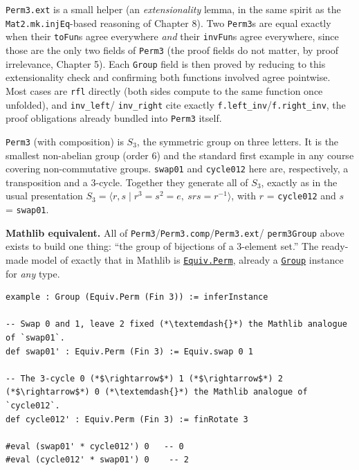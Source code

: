 \texttt{Perm3.ext} is a small helper (an \emph{extensionality} lemma, in the same spirit as the \texttt{Mat2.mk.injEq}-based reasoning of Chapter 8). Two \texttt{Perm3}s are equal exactly when their \texttt{toFun}s agree everywhere \emph{and} their \texttt{invFun}s agree everywhere, since those are the only two fields of \texttt{Perm3} (the proof fields do not matter, by proof irrelevance, Chapter 5). Each \texttt{Group} field is then proved by reducing to this extensionality check and confirming both functions involved agree pointwise. Most cases are \texttt{rfl} directly (both sides compute to the same function once unfolded), and \texttt{inv\_\allowbreak{}left}/ \texttt{inv\_\allowbreak{}right} cite exactly \texttt{f.left\_\allowbreak{}inv}/\texttt{f.right\_\allowbreak{}inv}, the proof obligations already bundled into \texttt{Perm3} itself.

\begin{mathreading}

\texttt{Perm3} (with composition) is \(S_3\), the symmetric group on three letters. It is the smallest non-abelian group (order \(6\)) and the standard first example in any course covering non-commutative groups. \texttt{swap01} and \texttt{cycle012} here are, respectively, a transposition and a 3-cycle. Together they generate all of \(S_3\), exactly as in the usual presentation \(S_3 = \langle r, s \mid r^3 = s^2 = e,\ srs = r^{-1} \rangle\), with \(r\) = \texttt{cycle012} and \(s\) = \texttt{swap01}.

\end{mathreading}

\textbf{Mathlib equivalent.} All of \texttt{Perm3}/\texttt{Perm3.comp}/\texttt{Perm3.ext}/ \texttt{perm3Group} above exists to build one thing: ``the group of bijections of a 3-element set.'' The ready-made model of exactly that in Mathlib is \href{https://loogle.lean-lang.org/?q=Equiv.Perm}{\texttt{Equiv.Perm}}, already a \href{https://loogle.lean-lang.org/?q=Group}{\texttt{Group}} instance for \emph{any} type.

\begin{lstlisting}
example : Group (Equiv.Perm (Fin 3)) := inferInstance

-- Swap 0 and 1, leave 2 fixed (*\textemdash{}*) the Mathlib analogue of `swap01`.
def swap01' : Equiv.Perm (Fin 3) := Equiv.swap 0 1

-- The 3-cycle 0 (*$\rightarrow$*) 1 (*$\rightarrow$*) 2 (*$\rightarrow$*) 0 (*\textemdash{}*) the Mathlib analogue of `cycle012`.
def cycle012' : Equiv.Perm (Fin 3) := finRotate 3

#eval (swap01' * cycle012') 0   -- 0
#eval (cycle012' * swap01') 0    -- 2
\end{lstlisting}

